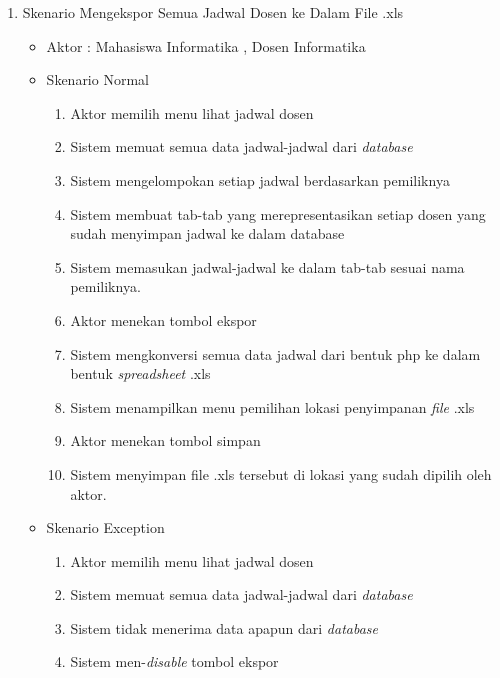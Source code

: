 \begin{enumerate}
	\item Skenario Mengekspor Semua Jadwal Dosen ke Dalam File .xls
	\begin{itemize}
		\item Aktor : Mahasiswa Informatika , Dosen Informatika
		\item Skenario Normal
			\begin{enumerate}[1.]
				\item Aktor memilih menu lihat jadwal dosen
				\item Sistem memuat semua data jadwal-jadwal dari \textit{database}
				\item Sistem mengelompokan setiap jadwal berdasarkan pemiliknya
				\item Sistem membuat tab-tab yang merepresentasikan setiap dosen yang sudah menyimpan jadwal ke dalam database
				\item Sistem memasukan jadwal-jadwal ke dalam tab-tab sesuai nama pemiliknya.
				\item Aktor menekan tombol ekspor
				\item Sistem mengkonversi semua data jadwal dari bentuk php ke dalam bentuk \textit{spreadsheet} .xls
				\item Sistem menampilkan menu pemilihan lokasi penyimpanan \textit{file} .xls
				\item Aktor menekan tombol simpan
				\item Sistem menyimpan file .xls tersebut di lokasi yang sudah dipilih oleh aktor.
			\end{enumerate}
		\item Skenario Exception
			\begin{enumerate}[1.]
				\item Aktor memilih menu lihat jadwal dosen
				\item Sistem memuat semua data jadwal-jadwal dari \textit{database}
				\item Sistem tidak menerima data apapun dari \textit{database}
				\item Sistem men-\textit{disable} tombol ekspor
			\end{enumerate}
	\end{itemize}
\end{enumerate}